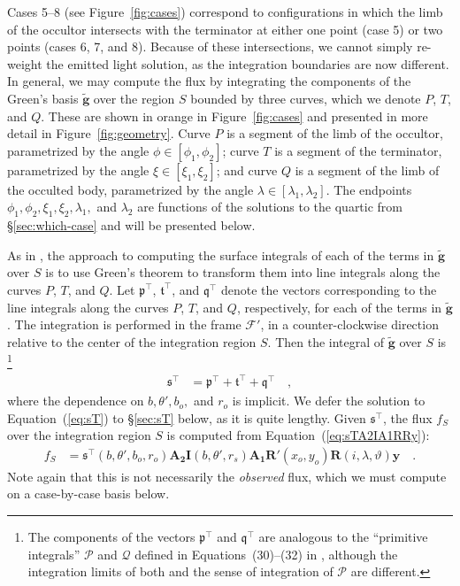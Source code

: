 \documentclass[modern]{aastex62}
\newcommand{\BF}[1]{\ensuremath{\mathbf{#1}}}
\newcommand{\sT}{\ensuremath{\mathfrak{s}^\top}}
\newcommand{\bg}{\ensuremath{\tilde{\BF{g}}}}
\begin{document}
Cases 5--8 (see Figure~\ref{fig:cases}) correspond to configurations in which
the limb of the occultor intersects with the terminator at either one point
(case 5) or two points (cases 6, 7, and 8). Because of these intersections, we
cannot simply re-weight the emitted light solution, as the integration
boundaries are now different. In general, we may compute the flux by
integrating the components of the Green's basis $\bg$
over the region $S$ bounded by three curves, which we denote
$P$, $T$, and $Q$. These are shown in orange
in Figure~\ref{fig:cases} and presented in more detail in
Figure~\ref{fig:geometry}.
Curve $P$ is a segment of the limb of
the occultor, parametrized by the angle $\phi \in [\phi_1, \phi_2]$;
curve $T$ is a segment of the terminator,
parametrized by the angle $\xi \in [\xi_1, \xi_2]$;
and curve $Q$ is a segment of the limb of the occulted body,
parametrized by the angle $\lambda \in [\lambda_1, \lambda_2]$.
The endpoints $\phi_1, \phi_2, \xi_1, \xi_2, \lambda_1,$ and
$\lambda_2$ are functions of the solutions to the quartic from
\S\ref{sec:which-case} and will be presented below.

As in \citet{Luger2019}, the approach to computing the surface integrals
of each of the terms in $\bg$ over $S$
is to use Green's theorem to transform them into line integrals along the
curves $P$, $T$, and $Q$. Let $\mathfrak{p}^\top$,
$\mathfrak{t}^\top$, and $\mathfrak{q}^\top$ denote the vectors
corresponding to the line integrals
along the curves $P$, $T$, and $Q$, respectively, for each of the terms in
$\bg$. The integration is performed in the frame $\mathcal{F}'$,
in a counter-clockwise direction relative to the center
of the integration region $S$.
Then the integral of $\bg$ over $S$ is%
\footnote{%
    The components of the vectors $\mathfrak{p}^\top$ and
    $\mathfrak{q}^\top$ are analogous to the ``primitive integrals''
    $\mathcal{P}$ and $\mathcal{Q}$
    defined in Equations~(30)--(32) in \citet{Luger2019}, although the
    integration limits of both and the sense of integration of $\mathcal{P}$
    are different.
}
%
\begin{align}
    \label{eq:sT}
    \sT & =
    \mathfrak{p}^\top + \mathfrak{t}^\top + \mathfrak{q}^\top
    \quad,
\end{align}
%
where the dependence on $b, \theta', b_o,$ and $r_o$ is implicit.
%
We defer the solution to Equation~(\ref{eq:sT}) to \S\ref{sec:sT} below,
as it is quite lengthy. Given $\sT$, the flux $f_S$ over the integration
region $S$ is computed from Equation~(\ref{eq:sTA2IA1RRy}):
%
\begin{align}
    \label{eq:fS}
    f_S & =
    \mathfrak{s}^\top(b, \theta', b_o, r_o)
    \BF{A_2}
    \BF{I}(b, \theta', r_s)
    \BF{A_1}
    \BF{R}'(x_o, y_o)
    \BF{R}(i, \lambda, \vartheta)
    \BF{y}
    \quad.
\end{align}
%
Note again that this is not necessarily the \emph{observed} flux, which we must
compute on a case-by-case basis below.
\end{document}
